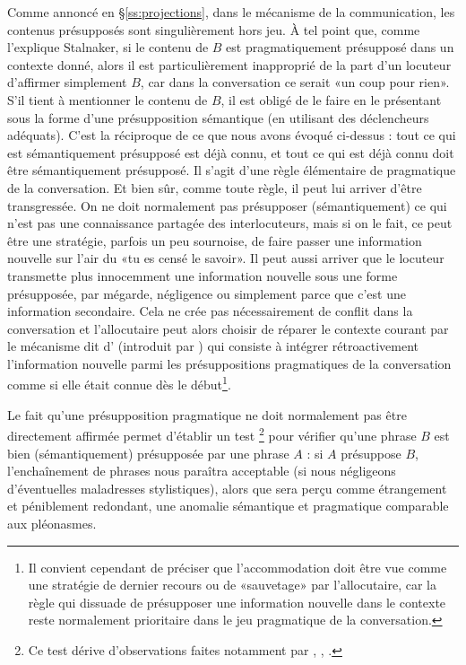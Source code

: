 \begin{refsegment}
Comme annoncé en \S\ref{ss:projections}, %
dans le mécanisme de la communication, les contenus présupposés sont singulièrement hors jeu. 
À tel point que, comme l'explique Stalnaker, si le contenu de $B$ est pragmatiquement présupposé dans un contexte donné, alors il est particulièrement inapproprié de la part d'un locuteur d'affirmer simplement $B$, car dans la conversation ce serait «un coup pour rien».  S'il tient à mentionner le contenu de $B$, il est obligé de le faire en le présentant sous la forme d'une présupposition sémantique (en utilisant des déclencheurs adéquats).  C'est la réciproque de ce que nous avons évoqué ci-dessus : tout ce qui est sémantiquement présupposé est déjà connu, et tout ce qui est déjà connu doit être sémantiquement présupposé.
Il s'agit d'une règle élémentaire de pragmatique de la conversation. Et bien sûr, comme toute règle, il peut lui arriver d'être transgressée.  On ne doit normalement pas présupposer (sémantiquement) ce qui n'est pas une connaissance partagée des interlocuteurs, mais si on le fait, ce peut être une stratégie, parfois un peu sournoise, de faire passer une information nouvelle sur l'air du «tu es censé le savoir».  Il peut aussi arriver que le locuteur transmette plus innocemment une information nouvelle sous une forme présupposée, par mégarde, négligence ou simplement parce que c'est une information secondaire. Cela ne crée pas nécessairement de conflit dans la conversation et l'allocutaire peut alors choisir de réparer le contexte courant par le mécanisme dit d'\label{p.accomm} (introduit par \citealt{Lewis:79}) qui consiste à intégrer rétroactivement l'information nouvelle parmi les présuppositions pragmatiques de la conversation comme si elle était connue dès le début\footnote{Il convient cependant de préciser que l'accommodation doit être vue comme une stratégie de dernier recours ou de «sauvetage» par l'allocutaire, car la règle qui dissuade de présupposer une information nouvelle dans le contexte reste normalement prioritaire dans le jeu pragmatique de la conversation.}.

Le fait qu'une présupposition pragmatique ne doit normalement pas être directement affirmée permet d'établir un %
test%
\footnote{Ce test dérive d'observations faites notamment par \citet{Ducrot:72}, \citet{Lewis:79},
\citet{Krfk:93}.}\label{p.testAB} 
pour vérifier qu'une phrase $B$ est bien (sémantiquement) présupposée par une phrase $A$ : si $A$ présuppose $B$,  l'enchaînement de phrases  nous paraîtra acceptable (si nous négligeons d'éventuelles maladresses stylistiques), alors que  sera perçu comme étrangement et péniblement redondant, une anomalie sémantique et pragmatique comparable aux pléonasmes.


\end{refsegment}
